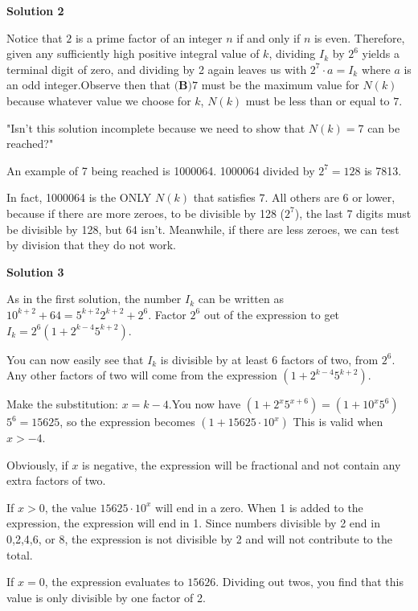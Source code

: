 \begin{enumerate}
 



\textbf{Solution 2}

Notice that $2$ is a prime factor of an integer $n$ if and only if $n$ is even. Therefore, given any sufficiently high positive integral value of $k$, dividing $I_k$ by $2^6$ yields a terminal digit of zero, and dividing by 2 again leaves us with $2^7 \cdot a = I_k$ where $a$ is an odd integer.Observe then that $\boxed{\textbf{(B)}7}$ must be the maximum value for $N(k)$ because whatever value we choose for $k$, $N(k)$ must be less than or equal to $7$.

 "Isn't this solution incomplete because we need to show that $N(k) = 7$ can be reached?"

 An example of 7 being reached is 1000064. 1000064 divided by $2^7=128$ is 7813.

 In fact, 1000064 is the ONLY $N(k)$ that satisfies $7$. All others are 6 or lower, because if there are more zeroes, to be divisible by 128 ($2^7$), the last 7 digits must be divisible by 128, but 64 isn't. Meanwhile, if there are less zeroes, we can test by division that they do not work.

 



\textbf{Solution 3}

As in the first solution, the number $I_k$ can be written as $10^{k+2} + 64 = 5^{k+2} 2^{k+2} + 2^6$. Factor $2^6$ out of the expression to get $I_k = 2^6(1+2^{k-4}5^{k+2})$.

 You can now easily see that $I_k$ is divisible by at least 6 factors of two, from $2^6$. Any other factors of two will come from the expression $(1+2^{k-4}5^{k+2})$. 

 Make the substitution: $x=k-4$.You now have $(1+2^{x}5^{x+6}) = (1+10^x 5^6)$
$5^6=15625$, so the expression becomes $(1+15625\cdot10^x)$ This is valid when $x>-4$. 

 Obviously, if $x$ is negative, the expression will be fractional and not contain any extra factors of two.

 If $x>0$, the value $15625\cdot10^x$ will end in a zero. When 1 is added to the expression, the expression will end in 1. Since numbers divisible by 2 end in 0,2,4,6, or 8, the expression is not divisible by 2 and will not contribute to the total.

 If $x=0$, the expression evaluates to $15626$. Dividing out twos, you find that this value is only divisible by one factor of 2.


\end{enumerate}
